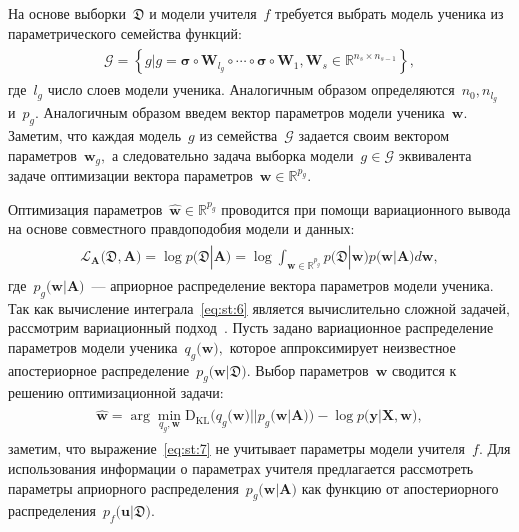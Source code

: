 \documentclass[12pt]{a&t}
\begin{document}
На основе выборки~$\mathfrak{D}$ и модели учителя~$f$ требуется выбрать модель ученика из параметрического семейства функций:
\begin{gather}
\label{eq:st:5}
\begin{aligned}
\mathcal{G} = \left\{g| g = \bm{\sigma} \circ \mathbf{W}_{l_g} \circ \cdots \circ \bm{\sigma} \circ \mathbf{W}_1, \mathbf{W}_s \in \mathbb{R}^{n_s \times n_{s-1}} \right\},
\end{aligned}
\end{gather}
где~${l_g}$ число слоев модели ученика. Аналогичным образом определяются~$n_0, n_{l_g}$ и~$p_g$. Аналогичным образом введем вектор параметров модели ученика~$\mathbf{w}.$ Заметим, что каждая модель~$g$ из семейства~$\mathcal{G}$ задается своим вектором параметров~$\mathbf{w}_g,$ а следовательно задача выборка модели~$g\in\mathcal{G}$ эквивалента задаче оптимизации вектора параметров~$\mathbf{w}\in\mathbb{R}^{p_g}$.

Оптимизация параметров~$\hat{\mathbf{w}} \in \mathbb{R}^{p_g}$ проводится при помощи вариационного вывода на основе совместного правдоподобия модели и данных:
\begin{gather}
\label{eq:st:6}
\begin{aligned}
\mathcal{L}_{\mathbf{A}}\bigr(\mathfrak{D}, \mathbf{A}\bigr) = \log p\bigr(\mathfrak{D}|\mathbf{A}\bigr) = \log \int_{\mathbf{w} \in \mathbb{R}^{p_g}}p\bigr(\mathfrak{D}|\mathbf{w}\bigr)p\bigr(\mathbf{w}|\mathbf{A}\bigr)d\mathbf{w},
\end{aligned}
\end{gather}
где~$p_g\bigr(\mathbf{w}| \mathbf{A}\bigr)$~--- априорное распределение вектора параметров модели ученика.
Так как вычисление интеграла~\eqref{eq:st:6} является вычислительно сложной задачей, рассмотрим вариационный подход~\cite{graves2011, grabovoy2019}. Пусть задано вариационное распределение параметров модели ученика~$q_g\bigr(\mathbf{w}\bigr),$ которое аппроксимирует неизвестное апостериорное распределение~$p_g\bigr(\mathbf{w}|\mathfrak{D}\bigr)$. Выбор параметров~$\mathbf{w}$ сводится к решению оптимизационной задачи:
\begin{gather}
\label{eq:st:7}
\begin{aligned}
\hat{\mathbf{w}} = \arg \min_{q_g, \mathbf{w}} \text{D}_{\text{KL}}\bigr(q_g\bigr(\mathbf{w}\bigr)||p_g\bigr(\mathbf{w}|\mathbf{A}\bigr)\bigr) - \log p\bigr(\mathbf{y}|\mathbf{X}, \mathbf{w}\bigr),
\end{aligned}
\end{gather}
заметим, что выражение~\eqref{eq:st:7} не учитывает параметры модели учителя~$f$. Для использования информации о параметрах учителя предлагается рассмотреть параметры априорного распределения~$p_g\bigr(\mathbf{w}|\mathbf{A}\bigr)$ как функцию от апостериорного распределения~$p_f\bigr(\mathbf{u}|\mathfrak{D}\bigr)$.
\end{document}
